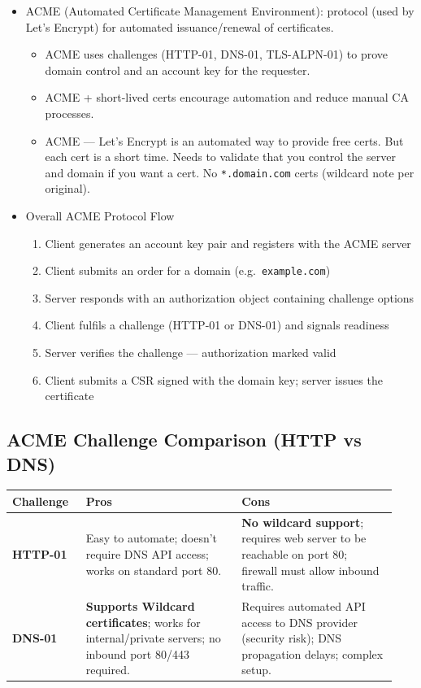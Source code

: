 \documentclass[12pt]{article}
\begin{document}
\begin{itemize}
  \item ACME (Automated Certificate Management Environment): protocol (used by Let's Encrypt) for automated issuance/renewal of certificates.
    \begin{itemize}
      \item ACME uses challenges (HTTP-01, DNS-01, TLS-ALPN-01) to prove domain control and an account key for the requester.
      \item ACME + short-lived certs encourage automation and reduce manual CA processes.
      \item ACME --- Let's Encrypt is an automated way to provide free certs. But each cert is a short time. Needs to validate that you control the server and domain if you want a cert. No \texttt{*.domain.com} certs (wildcard note per original).
    \end{itemize}
  \item Overall ACME Protocol Flow
    \begin{enumerate}[label=\arabic*.]
      \item Client generates an account key pair and registers with the ACME server
      \item Client submits an order for a domain (e.g.\ \texttt{example.com})
      \item Server responds with an authorization object containing challenge options
      \item Client fulfils a challenge (HTTP-01 or DNS-01) and signals readiness
      \item Server verifies the challenge --- authorization marked valid
      \item Client submits a CSR signed with the domain key; server issues the certificate
    \end{enumerate}
\end{itemize}

\subsection{ACME Challenge Comparison (HTTP vs DNS)}
\begin{center}
\begin{tabular}{@{}p{0.18\linewidth}p{0.38\linewidth}p{0.38\linewidth}@{}}
\toprule
\textbf{Challenge} & \textbf{Pros} & \textbf{Cons} \\
\midrule
\textbf{HTTP-01} & Easy to automate; doesn't require DNS API access; works on standard port 80. & \textbf{No wildcard support}; requires web server to be reachable on port 80; firewall must allow inbound traffic. \\
\textbf{DNS-01} & \textbf{Supports Wildcard certificates}; works for internal/private servers; no inbound port 80/443 required. & Requires automated API access to DNS provider (security risk); DNS propagation delays; complex setup. \\
\bottomrule
\end{tabular}
\end{center}
\end{document}

